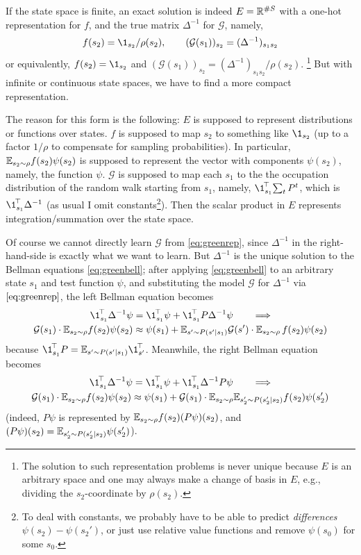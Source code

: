 \documentclass[11pt,a4paper]{article}
\newcommand{\green}{\mathcal{G}}
\begin{document}
If the state space is finite, an exact
solution is indeed $E={\mathbb{R}}^{\#S}$ with a one-hot representation for $f$,
and the true matrix $\Delta^{-1}$ for $\green$, namely,
\begin{equation}
f(s_2)=\1_{s_2}/\rho(s_2),\qquad
(\green(s_1))_{s_2}=(\Delta^{-1})_{s_1s_2}
\end{equation}
or equivalently, $f(s_2)=\1_{s_2}$ and
$(\green(s_1))_{s_2}=(\Delta^{-1})_{s_1s_2}/\rho(s_2)$. \footnote{The solution to
such representation problems is never unique because $E$ is an arbitrary
space and one may always make a change of basis in $E$, e.g., dividing
the $s_2$-coordinate by $\rho(s_2)$.}
But with infinite or continuous state spaces, we have to find a more
compact representation.

The reason for this form is the following: $E$ is supposed to represent
distributions or functions over states. $f$ is supposed to map $s_2$ to
something like
$\1_{s_2}$ (up to a factor $1/\rho$ to compensate for sampling
probabilities). 
In
particular, $\mathbb{E}_{s_2\sim \rho}f(s_2)\psi(s_2)$ is supposed to represent
the vector with components $\psi(s_2)$, namely, the function $\psi$. $\green$ is supposed to map each
$s_1$ to the
the occupation
distribution of the random walk starting from $s_1$, namely,
$\transp{\1_{s_1}}\sum_t P^t$, which is $\transp{\1_{s_1}}\,\Delta^{-1}$
(as usual I
omit constants\footnote{To deal with constants, we probably have to be
able to predict \emph{differences} $\psi(s_2)-\psi(s_2')$, or just use
relative value functions and remove $\psi(s_0)$ for some $s_0$.}). Then the scalar product in
$E$ represents integration/summation over the state space.

Of course we cannot directly learn $\green$ from \eqref{eq:greenrep},
since $\Delta^{-1}$ in the right-hand-side is exactly what we want to
learn. But $\Delta^{-1}$ is the unique solution to the Bellman equations \eqref{eq:greenbell}; after
applying \eqref{eq:greenbell} to an arbitrary state $s_1$ and test
function $\psi$, and
substituting the model $\green$ for $\Delta^{-1}$ via
$\eqref{eq:greenrep}$, the left Bellman equation becomes
\begin{gather}
\transp{\1_{s_1}}\,\Delta^{-1}\psi=\transp{\1_{s_1}}\,\psi+\transp{\1_{s_1}}\,P\Delta^{-1}\psi
\qquad \Longrightarrow
\\
\green(s_1)\cdot\E_{s_2\sim \rho}
f(s_2)\psi(s_2)
\approx \psi(s_1)+ \E_{s'\sim P(s'|s_1)}\green(s')\cdot
\E_{s_2\sim \rho}\,
f(s_2)\psi(s_2)
\end{gather}
because $\transp{\1_{s_1}}\,P=\E_{s'\sim P(s'|s_1)}\transp{\1_{s'}}\,$.
Meanwhile,
the right Bellman equation becomes
\begin{gather}
\transp{\1_{s_1}}\,\Delta^{-1}\psi=\transp{\1_{s_1}}\,\psi+\transp{\1_{s_1}}\,\Delta^{-1}P\psi
\qquad \Longrightarrow
\\
\green(s_1)\cdot\E_{s_2\sim \rho}
f(s_2)\psi(s_2)
\approx \psi(s_1)+ \green(s_1)\cdot\E_{s_2\sim \rho}\E_{s'_2\sim P(s'_2|s_2)}
f(s_2)\psi(s'_2)
\end{gather}
(indeed, 
$P\psi$ is
represented by $\mathbb{E}_{s_2\sim \rho} f(s_2)(P\psi)(s_2)$, and
$(P\psi)(s_2)=\mathbb{E}_{s'_2\sim P(s'_2|s_2)}\psi(s'_2)$).
\end{document}
